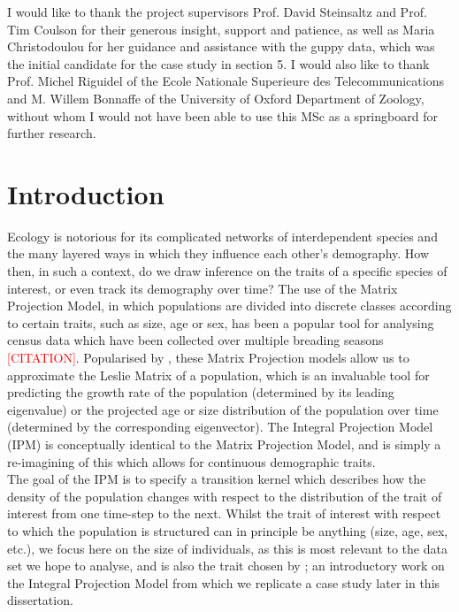 \documentclass[a4paper,12pt]{article}
\begin{document}
I would like to thank the project supervisors Prof. David Steinsaltz and Prof. Tim Coulson for their generous insight, support and patience, as well as Maria Christodoulou for her guidance and assistance with the guppy data, which was the initial candidate for the case study in section 5. I would also like to thank Prof. Michel Riguidel of the Ecole Nationale Superieure des Telecommunications and M. Willem Bonnaffe of the University of Oxford Department of Zoology, without whom I would not have been able to use this MSc as a springboard for further research.

\clearpage


\tableofcontents
\listofalgorithms
\listoffigures
\listoftables


\clearpage


\section{Introduction}

Ecology is notorious for its complicated networks of interdependent species and the many layered ways in which they influence each other's demography. How then, in such a context, do we draw inference on the traits of a specific species of interest, or even track its demography over time? The use of the Matrix Projection Model, in which populations are divided into discrete classes according to certain traits, such as size, age or sex, has been a popular tool for analysing census data which have been collected over multiple breading seasons \textcolor{red}{[CITATION]}. Popularised by \citet{MatrixProjection}, these Matrix Projection models allow us to approximate the Leslie Matrix \citep{Leslie} of a population, which is an invaluable tool for predicting the growth rate of the population (determined by its leading eigenvalue) or the projected age or size distribution of the population over time (determined by the corresponding eigenvector). The Integral Projection Model (IPM) is conceptually identical to the Matrix Projection Model, and is simply a re-imagining of this which allows for continuous demographic traits.\\

The goal of the IPM is to specify a transition kernel which describes how the density of the population changes with respect to the distribution of the trait of interest from one time-step to the next. Whilst the trait of interest with respect to which the population is structured can in principle be anything (size, age, sex, etc.), we focus here on the size of individuals, as this is most relevant to the data set we hope to analyse, and is also the trait chosen by \citet{Ellner}; an introductory work on the Integral Projection Model from which we replicate a case study later in this dissertation. \\
\end{document}
